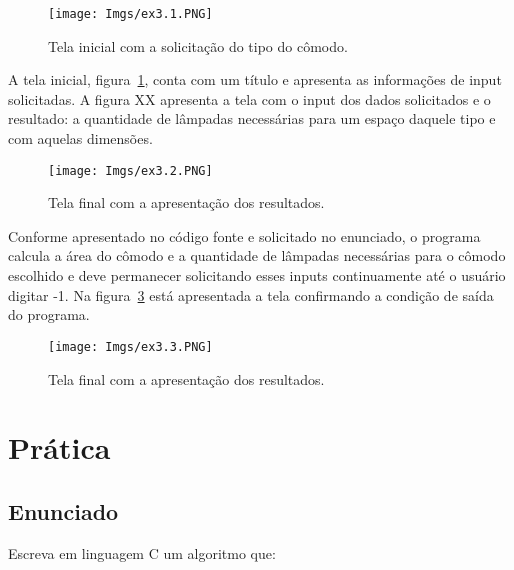 \documentclass[
	12pt,				%
	openright,			%
	oneside,			%
	a4paper,			%
	chapter=TITLE,		%
	section=TITLE,		%
	english,			%
	french,				%
	spanish,			%
	brazil				%
	]{abntex2}
\begin{document}
	\begin{figure}[htp]
		\begin{center}
			\caption{Tela inicial com a solicitação do tipo do cômodo.} 
			\texttt{[image: Imgs/ex3.1.PNG]}
			\label{fig:ex3.1}
		\end{center}
	\end{figure}
	
	A tela inicial, figura~\ref{fig:ex3.1}, conta com um título e apresenta as informações de input solicitadas. A figura XX apresenta a tela com o input dos dados solicitados e o resultado: a quantidade de lâmpadas necessárias para um espaço daquele tipo e com aquelas dimensões.

	\begin{figure}[htp]
		\begin{center}
			\caption{Tela final com a apresentação dos resultados.} 
			\texttt{[image: Imgs/ex3.2.PNG]}
			\label{fig:ex3.2}
		\end{center}
	\end{figure}

	Conforme apresentado no código fonte e solicitado no enunciado, o programa calcula a área do cômodo e a quantidade de lâmpadas necessárias para o cômodo escolhido e deve permanecer solicitando esses inputs continuamente até o usuário digitar -1. Na figura~\ref{fig:ex3.3} está apresentada a tela confirmando a condição de saída do programa.

	\begin{figure}[htp]
		\begin{center}
			\caption{Tela final com a apresentação dos resultados.} 
			\texttt{[image: Imgs/ex3.3.PNG]}
			\label{fig:ex3.3}
		\end{center}
	\end{figure}

\chapter[\bfseries{PRÁTICA 4}]{\bfseries{Prática}}

\section[ENUNCIADO]{Enunciado}
	
	Escreva em linguagem C um algoritmo que:
\end{document}
